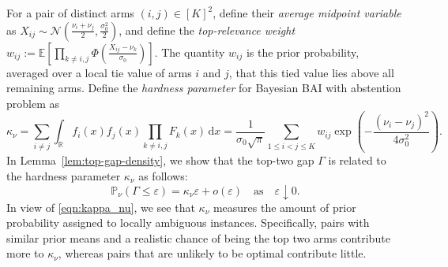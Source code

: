 \documentclass[10pt]{article}
\newcommand{\dd}{\mathrm{d}}
\theoremstyle{plain}
\begin{document}
For a  pair of distinct arms $(i,j) \in[K]^2$, define their {\em average midpoint variable} as
    $X_{ij}
    \sim
    \mathcal N\!\left(
        \frac{\nu_i+\nu_j}{2},
        \frac{\sigma_0^2}{2}
    \right)$,
and define the \emph{top-relevance weight}
    $w_{ij}
    :=
    \mathbb E\!\left[
        \prod_{k\neq i,j}
        \Phi\!\left(\frac{X_{ij}-\nu_k}{\sigma_0}\right)
    \right]$.
The quantity $w_{ij}$ is the prior probability, averaged over a local tie value
of arms $i$ and $j$, that this tied value lies above all remaining arms.
Define the \emph{hardness parameter} for Bayesian BAI with abstention problem as
\[
    \kappa_\nu
    =
    \sum_{i\neq j}
    \int_{\mathbb R}
    f_i(x)f_j(x)
    \prod_{k\neq i,j}F_k(x)\,\dd x 
    =
    \frac{1}{\sigma_0\sqrt\pi} \sum_{1\le i<j\le K}
    w_{ij}
    \exp\!\left(
        -\frac{(\nu_i-\nu_j)^2}{4\sigma_0^2}
    \right).
\]
In Lemma~\ref{lem:top-gap-density}, we show that the top-two gap $\Gamma$ is related to the   hardness parameter $\kappa_\nu$ as follows:
\begin{equation}
    \mathbb P_\nu(\Gamma\le \varepsilon) = \kappa_\nu\varepsilon + o(\varepsilon)\quad \mbox{as}\quad \varepsilon\downarrow 0. \label{eqn:kappa_nu}
\end{equation}
In view of \eqref{eqn:kappa_nu}, we see that $\kappa_\nu$ measures the amount of
prior probability assigned to locally ambiguous instances.
Specifically, pairs with similar prior means and a realistic chance of being the top two arms contribute more to $\kappa_\nu$, whereas pairs that are unlikely to be  optimal contribute little.
\end{document}
